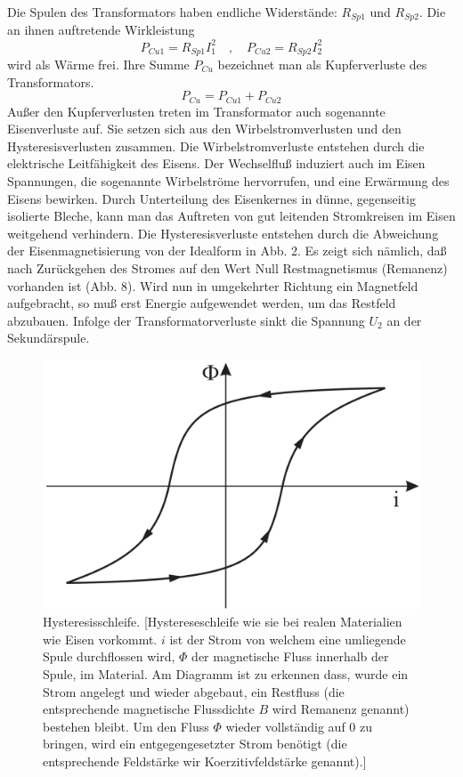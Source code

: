 \documentclass[12pt,a4paper,twoside]{article}
\theoremstyle{definition}
\begin{document}
Die Spulen des Transformators haben endliche Widerstände: $R_{Sp1}$ und $R_{Sp2}$. Die an ihnen auftretende Wirkleistung
\begin{equation}
    P_{Cu1} = R_{Sp1} I_1^2 \quad , \quad P_{Cu2} = R_{Sp2} I_2^2
\end{equation}
wird als Wärme frei. Ihre Summe $P_{Cu}$ bezeichnet man als Kupferverluste des Transformators.
\begin{equation}
    P_{Cu} = P_{Cu1} + P_{Cu2}
\end{equation}
Außer den Kupferverlusten treten im Transformator auch sogenannte Eisenverluste auf. Sie setzen sich aus den Wirbelstromverlusten und den Hysteresisverlusten zusammen. Die Wirbelstromverluste entstehen durch die elektrische Leitfähigkeit des Eisens. Der Wechselfluß induziert auch im Eisen Spannungen, die sogenannte Wirbelströme hervorrufen, und eine Erwärmung des Eisens bewirken. Durch Unterteilung des Eisenkernes in dünne, gegenseitig isolierte Bleche, kann man das Auftreten von gut leitenden Stromkreisen im Eisen weitgehend verhindern. Die Hysteresisverluste entstehen durch die Abweichung der Eisenmagnetisierung von der Idealform in Abb. 2. Es zeigt sich nämlich, daß nach Zurückgehen des Stromes auf den Wert Null Restmagnetismus (Remanenz) vorhanden ist (Abb. 8). Wird nun in umgekehrter Richtung ein Magnetfeld aufgebracht, so muß erst Energie aufgewendet werden, um das Restfeld abzubauen. Infolge der Transformatorverluste sinkt die Spannung $U_2$ an der Sekundärspule.
\begin{figure}[H]
    \centering
    \includegraphics[width=\linewidth/2]{grundlagen/abb8}
    \caption{Hysteresisschleife. [Hystereseschleife wie sie bei realen Materialien wie Eisen vorkommt. $i$ ist der Strom von welchem eine umliegende Spule durchflossen wird, $\Phi$ der magnetische Fluss innerhalb der Spule, im Material. Am Diagramm ist zu erkennen dass, wurde ein Strom angelegt und wieder abgebaut, ein Restfluss (die entsprechende magnetische Flussdichte $B$ wird Remanenz genannt) bestehen bleibt. Um den Fluss $\Phi$ wieder vollständig auf 0 zu bringen, wird ein entgegengesetzter Strom benötigt (die entsprechende Feldstärke wir Koerzitivfeldstärke genannt).]}
\end{figure}
\newpage
\end{document}
